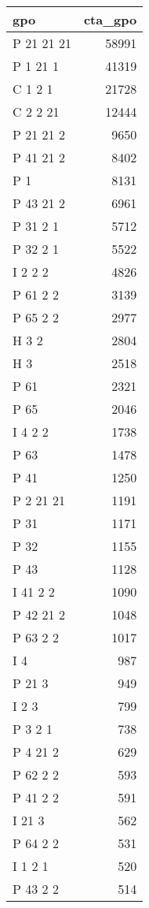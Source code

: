 \documentclass[
]{book}
\begin{document}
\begin{table}[H]
\centering
\begin{tabular}{l|r}
\hline
gpo & cta\_gpo\\
\hline
P 21 21 21 & 58991\\
\hline
P 1 21 1 & 41319\\
\hline
C 1 2 1 & 21728\\
\hline
C 2 2 21 & 12444\\
\hline
P 21 21 2 & 9650\\
\hline
P 41 21 2 & 8402\\
\hline
P 1 & 8131\\
\hline
P 43 21 2 & 6961\\
\hline
P 31 2 1 & 5712\\
\hline
P 32 2 1 & 5522\\
\hline
I 2 2 2 & 4826\\
\hline
P 61 2 2 & 3139\\
\hline
P 65 2 2 & 2977\\
\hline
H 3 2 & 2804\\
\hline
H 3 & 2518\\
\hline
P 61 & 2321\\
\hline
P 65 & 2046\\
\hline
I 4 2 2 & 1738\\
\hline
P 63 & 1478\\
\hline
P 41 & 1250\\
\hline
P 2 21 21 & 1191\\
\hline
P 31 & 1171\\
\hline
P 32 & 1155\\
\hline
P 43 & 1128\\
\hline
I 41 2 2 & 1090\\
\hline
P 42 21 2 & 1048\\
\hline
P 63 2 2 & 1017\\
\hline
I 4 & 987\\
\hline
P 21 3 & 949\\
\hline
I 2 3 & 799\\
\hline
P 3 2 1 & 738\\
\hline
P 4 21 2 & 629\\
\hline
P 62 2 2 & 593\\
\hline
P 41 2 2 & 591\\
\hline
I 21 3 & 562\\
\hline
P 64 2 2 & 531\\
\hline
I 1 2 1 & 520\\
\hline
P 43 2 2 & 514\\

\end{tabular}
\end{table}
\end{document}
